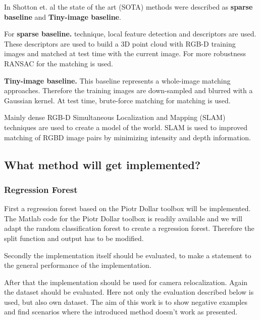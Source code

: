In Shotton et. al \cite{shotton} the state of the art (SOTA) methods were described as \textbf{sparse baseline} and \textbf{Tiny-image baseline}. 

For \textbf{sparse baseline.} technique, local feature detection and descriptors are used. These descriptors are used to build a 3D point cloud with RGB-D training images and matched at test time with the current image. For more robustness RANSAC \cite{Henry10rgbdmapping} for the matching is used. \cite{DBLP:conf/bmvc/GeeM12} 

\textbf{Tiny-image baseline.} This baseline represents a whole-image matching approaches. Therefore the training images are down-sampled and blurred with a Gaussian kernel. At test time, brute-force matching for matching is used.

Mainly dense RGB-D Simultaneous Localization and Mapping (SLAM) \cite{Comport10} techniques \cite{DamenGMC12} are used to create a model of the world. SLAM is used to improved matching of RGBD image pairs by minimizing intensity and depth information.



\subsection{What method will get implemented?} %
\label{sub:what_method_will_get_implemented_}

\subsubsection*{Regression Forest} %
\label{ssub:regression_forest}

First a regression forest based on the Piotr Dollar toolbox \cite{piotr} will be implemented. The Matlab code for the Piotr Dollar toolbox is readily available and we will adapt the random classification forest to create a regression forest. Therefore the split function and output has to be modified.

Secondly the implementation itself should be evaluated, to make a statement to the general performance of the implementation.

After that the implementation should be used for camera relocalization. Again the dataset should be evaluated. Here not only the evaluation described below is used, but also own dataset. The aim of this work is to show negative examples and find scenarios where the introduced method \cite{shotton} doesn't work as presented.


